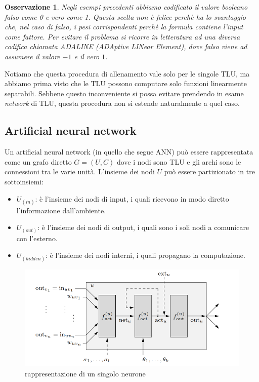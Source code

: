 \documentclass[10pt,a4paper]{article}
\newtheorem{remark}{Osservazione}
\begin{document}
\begin{remark}
Negli esempi precedenti abbiamo codificato il valore booleano \emph{falso} come 0 e \emph{vero} come 1. Questa scelta non è felice perchè ha lo svantaggio che, nel caso di \emph{falso}, i pesi corrispondenti perchè la formula contiene l'input come fattore. Per evitare il problema si ricorre in letteratura ad una diversa codifica chiamata \emph{ADALINE} (ADAptive LINear Element), dove \emph{falso} viene ad assumere il valore $-1$ e il \emph{vero} $1$.
\end{remark}

Notiamo che questa procedura di allenamento vale solo per le singole TLU, ma abbiamo prima visto che le TLU possono computare solo funzioni linearmente separabili. Sebbene questo inconveniente si possa evitare prendendo in esame \emph{network} di TLU, questa procedura non si estende naturalmente a quel caso.

\subsection{Artificial neural network}

Un artificial neural network (in quello che segue ANN) può essere rappresentata come un grafo diretto $G = (U,C)$ dove i nodi sono TLU e gli archi sono le connessioni tra le varie unità. L'insieme dei nodi $U$ può essere partizionato in tre sottoinsiemi:

\begin{itemize}
\item{$U_{(in)}$: è l'insieme dei nodi di input, i quali ricevono in modo diretto l'informazione dall'ambiente.}
\item{$U_{(out)}$: è l'insieme dei nodi di output, i quali sono i soli nodi a comunicare con l'esterno.}
\item{$U_{(hidden)}$: è l'insieme dei nodi interni, i quali propagano la computazione.}
\end{itemize}

\begin{figure}
\centering
\includegraphics[scale=0.4]{img/ANN.png}
\caption{rappresentazione di un singolo neurone}
\label{fig:7}
\end{figure}
\end{document}
